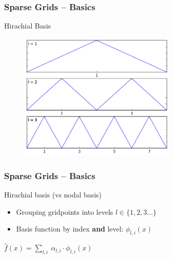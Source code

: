 \begin{frame}
  \frametitle{Sparse Grids -- Basics}
  \topline
  \vspace{-10px}
  \begin{block}{Hirachial Basis}
    \begin{figure}[!htp]
      \centering
      \includegraphics[width=7.5cm]{images/sparse_hats}
      \vspace{-12px}
      \caption{}
    \end{figure}
  \end{block}
\end{frame}

\begin{frame}
  \frametitle{Sparse Grids -- Basics}
  \topline
  \vspace{-10px}
  \begin{block}{Hirachial basis (vs nodal basis)}
    \begin{itemize}
      \item Grouping gridpoints into levels $l \in \{1,2,3\dots\}$
      \item Basis function by index \textbf{and} level: $\phi_{l,i}(x)$
    \end{itemize}
    \vspace{20px}
    \begin{center}
      $\hat{f}(x) = \sum_{l,i}{\ \alpha_{l,i} \cdot \phi_{l,i}(x)}$
    \end{center}
  \end{block}
\end{frame}

